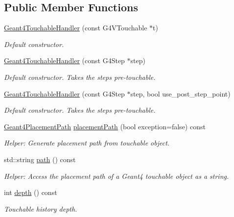 \subsection*{Public Member Functions}
\begin{DoxyCompactItemize}
\item 
\hyperlink{class_d_d4hep_1_1_simulation_1_1_geant4_touchable_handler_a94190007b2cfab9cab06a0de576cc23f}{Geant4\+Touchable\+Handler} (const G4\+V\+Touchable $\ast$t)
\begin{DoxyCompactList}\small\item\em Default constructor. \end{DoxyCompactList}\item 
\hyperlink{class_d_d4hep_1_1_simulation_1_1_geant4_touchable_handler_af2bd4df9a960cd1093e18204c8097b39}{Geant4\+Touchable\+Handler} (const G4\+Step $\ast$step)
\begin{DoxyCompactList}\small\item\em Default constructor. Takes the step\textquotesingle{}s pre-\/touchable. \end{DoxyCompactList}\item 
\hyperlink{class_d_d4hep_1_1_simulation_1_1_geant4_touchable_handler_ac4e6b8879c60c24faac7389def633092}{Geant4\+Touchable\+Handler} (const G4\+Step $\ast$step, bool use\+\_\+post\+\_\+step\+\_\+point)
\begin{DoxyCompactList}\small\item\em Default constructor. Takes the step\textquotesingle{}s pre-\/touchable. \end{DoxyCompactList}\item 
\hyperlink{class_d_d4hep_1_1_simulation_1_1_geant4_touchable_handler_a3ba887af055edecb3e6cfb04f2c7dc2c}{Geant4\+Placement\+Path} \hyperlink{class_d_d4hep_1_1_simulation_1_1_geant4_touchable_handler_a2c26cd5e6ac575c7e1a3d95d3f9429b8}{placement\+Path} (bool exception=false) const
\begin{DoxyCompactList}\small\item\em Helper\+: Generate placement path from touchable object. \end{DoxyCompactList}\item 
std\+::string \hyperlink{class_d_d4hep_1_1_simulation_1_1_geant4_touchable_handler_a7078dc9cd3315c3ad09436fee3e90311}{path} () const
\begin{DoxyCompactList}\small\item\em Helper\+: Access the placement path of a Geant4 touchable object as a string. \end{DoxyCompactList}\item 
int \hyperlink{class_d_d4hep_1_1_simulation_1_1_geant4_touchable_handler_ab56efe73054c432cdffdcdc911229062}{depth} () const
\begin{DoxyCompactList}\small\item\em Touchable history depth. \end{DoxyCompactList}\end{DoxyCompactItemize}
